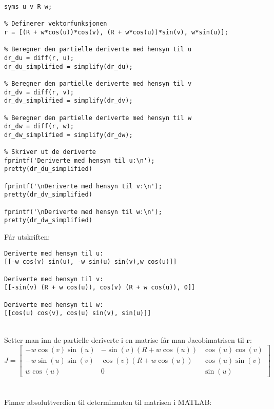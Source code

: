\begin{lstlisting}[style=Matlab-editor]
% Definerer symbolske variabler
syms u v R w;

% Definerer vektorfunksjonen
r = [(R + w*cos(u))*cos(v), (R + w*cos(u))*sin(v), w*sin(u)];

% Beregner den partielle deriverte med hensyn til u
dr_du = diff(r, u);
dr_du_simplified = simplify(dr_du);

% Beregner den partielle deriverte med hensyn til v
dr_dv = diff(r, v);
dr_dv_simplified = simplify(dr_dv);

% Beregner den partielle deriverte med hensyn til w
dr_dw = diff(r, w);
dr_dw_simplified = simplify(dr_dw);

% Skriver ut de deriverte
fprintf('Deriverte med hensyn til u:\n');
pretty(dr_du_simplified)

fprintf('\nDeriverte med hensyn til v:\n');
pretty(dr_dv_simplified)

fprintf('\nDeriverte med hensyn til w:\n');
pretty(dr_dw_simplified)
\end{lstlisting}
Får utskriften:
\begin{lstlisting}
Deriverte med hensyn til u:
[[-w cos(v) sin(u), -w sin(u) sin(v),w cos(u)]]

Deriverte med hensyn til v:
[[-sin(v) (R + w cos(u)), cos(v) (R + w cos(u)), 0]]

Deriverte med hensyn til w:
[[cos(u) cos(v), cos(u) sin(v), sin(u)]]
\end{lstlisting}\\
\vspace{0.1in}
Setter man inn de partielle deriverte i en matrise får man Jacobimatrisen til $\boldsymbol{r}$:\\
\begin{equation} \nonumber
J = 
\begin{bmatrix}
-w \cos(v) \sin(u) & -\sin(v) (R + w \cos(u)) & \cos(u) \cos(v) \\
-w \sin(u) \sin(v) & \cos(v) (R + w \cos(u)) & \cos(u) \sin(v) \\
w \cos(u) & 0 & \sin(u)
\end{bmatrix}
\end{equation}\\
\\ Finner absoluttverdien til determinanten til matrisen i MATLAB:
\vspace{0.1in}
